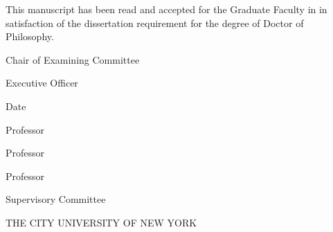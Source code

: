 \clearpage\thispagestyle{empty}
\begin{vplace}
\begin{SingleSpace}

\centering

\noindent This manuscript has been read and accepted for the Graduate Faculty
in \MyDiscipline in satisfaction of the dissertation requirement for the degree of
Doctor of Philosophy.

\vskip 1in
\flushleft

\hrulefill
\newline
\AdviserName
\newline
Chair of Examining Committee
\vspace{0.5in}

\hrulefill
\newline
\EOName
\newline
Executive Officer
\vspace{0.5in}

\hrulefill
\newline
Date
\vspace{0.5in}
\newline

Professor \FirstCommitteeMember \\
\hrulefill

Professor \SecondCommitteeMember \\
\hrulefill

Professor \ThirdCommitteeMember \\
\hrulefill

Supervisory Committee

\vskip 1in
\centering

\MakeUppercase{The City University of New York}

\end{SingleSpace}
\end{vplace}
